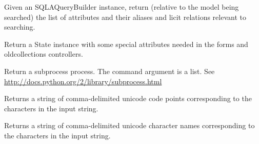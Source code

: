 \documentclass[letterpaper,10pt,english]{sphinxmanual}
\begin{document}

\begin{fulllineitems}
\label{api:old.lib.utils.getSearchParameters}
Given an SQLAQueryBuilder instance, return (relative to the model being
searched) the list of attributes and their aliases and licit relations
relevant to searching.

\end{fulllineitems}


\begin{fulllineitems}
\label{api:old.lib.utils.getStateObject}
Return a State instance with some special attributes needed in the forms
and oldcollections controllers.

\end{fulllineitems}


\begin{fulllineitems}
\label{api:old.lib.utils.getSubprocess}
Return a subprocess process.  The command argument is a list.  See
\href{http://docs.python.org/2/library/subprocess.html}{http://docs.python.org/2/library/subprocess.html}

\end{fulllineitems}


\begin{fulllineitems}
\label{api:old.lib.utils.getUnicodeCodePoints}
Returns a string of comma-delimited unicode code points corresponding
to the characters in the input string.

\end{fulllineitems}


\begin{fulllineitems}
\label{api:old.lib.utils.getUnicodeNames}
Returns a string of comma-delimited unicode character names corresponding
to the characters in the input string.

\end{fulllineitems}
\end{document}
